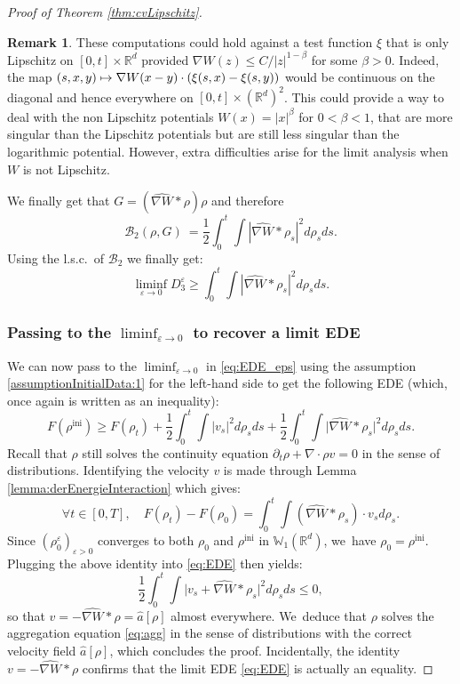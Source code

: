 \documentclass[JEP,XML,SOM,Unicode, NoFloatCountersInSection,published]{cedram}
\newcommand\mto{\mathchoice{\longmapsto}{\mapsto}{\mapsto}{\mapsto}}
\newcommand{\ini}{\mathrm{ini}}
\def\RR{\mathbb{R}}
\def\WW{\mathbb{W}}
\def\eps{\varepsilon}
\def\pa{\partial}
\def\calB{{\mathcal B}}
\def\achapo{\widehat{a}}
\def\nabWchapo{\widehat{\nabla W}}
\theoremstyle{plain}
\theoremstyle{definition}
\newtheorem{remark}[theorem]{Remark}
\begin{document}
\begin{proof}[Proof of Theorem \ref{thm:cvLipschitz}]
\begin{remark}
These computations could hold against a test function $\xi$ that is only Lipschitz on $[0,t] \times \RR^d$ provided $\nabla W(z) \leq C / |z|^{1-\beta}$ for some $\beta > 0$. Indeed, the map $(s,x,y) \mto \nabla W(x - y) \cdot \left( \xi(s, x) - \xi(s,y) \right)$ would be continuous on the diagonal and hence everywhere on $[0,t] \times (\RR^d)^2$. This could provide a way to deal with the non Lipschitz potentials $W(x) = |x|^\beta$ for $0<\beta<1$, that are more singular than the Lipschitz potentials but are still less singular than the logarithmic potential. However, extra difficulties arise for the limit analysis when $W$ is not Lipschitz.
\end{remark}

We finally get that $G = (\nabWchapo * \rho) \rho$ and therefore
\[
\calB_2(\rho, G)\ = \frac 12 \int_0^t \int |\nabWchapo * \rho_s|^2 d\rho_s ds.
\]
Using the l.s.c.\ of $\calB_2$ we finally get:
\[
\liminf_{\eps \to 0} D_3^\eps \geq \int_0^t \int |\nabWchapo * \rho_s|^2 d\rho_s ds.
\]
\subsubsection*{Passing to the $\liminf_{\eps \to 0}$ to recover a limit EDE}

We can now pass to the $\liminf_{\eps \to 0}$ in \eqref{eq:EDE_eps} using the assumption \eqref{assumptionInitialData:1} for the left-hand side to get the following EDE (which, once again is written as an inequality):
\begin{equation}\label{eq:EDE}
F(\rho^{\ini}) \geq F(\rho_t) + \frac 12 \int_0^t \int |v_s|^2 d\rho_s ds + \frac 12 \int_0^t \int \big| \nabWchapo * \rho_s \big|^2 d\rho_s ds.
\end{equation}
Recall that $\rho$ still solves the continuity equation $\pa_t \rho + \nabla \cdot \rho v = 0$ in the sense of distributions. Identifying the velocity $v$ is made through Lemma \ref{lemma:derEnergieInteraction} which gives:
\[
\forall t \in [0,T], \quad F(\rho_t) - F(\rho_0) = \int_0^t \int (\nabWchapo * \rho_s) \cdot v_s d\rho_s.
\]
Since $(\rho_0^\eps)_{\eps >0}$ converges to both $\rho_0$ and $\rho^{\ini}$ in $\WW_1(\RR^d)$, we~have $\rho_0 = \rho^{\ini}$. Plugging the above identity into \eqref{eq:EDE} then yields:
\[
\frac 12 \int_0^t \int \Big|v_s + \nabWchapo * \rho_s \Big|^2 d\rho_s ds \leq 0,
\]
so that $v = - \nabWchapo * \rho = \achapo[\rho]$ almost everywhere. We~deduce that $\rho$ solves the aggregation equation \eqref{eq:agg} in the sense of distributions with the correct velocity field $\achapo[\rho]$, which concludes the proof. Incidentally, the identity $v = - \nabWchapo * \rho$ confirms that the limit EDE \eqref{eq:EDE} is actually an equality.
\end{proof}
\end{document}
